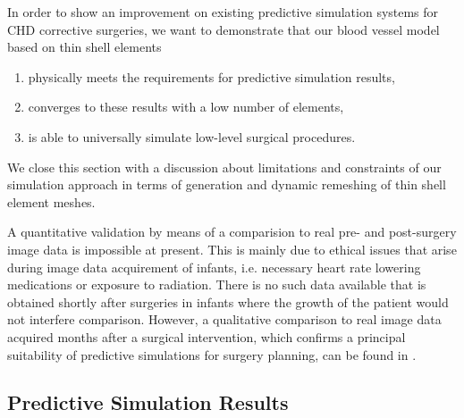 In order to show an improvement on existing predictive simulation systems for CHD corrective surgeries, we want to demonstrate that our blood vessel model based on thin shell elements
\begin{enumerate}
\item physically meets the requirements for predictive simulation results,
\item converges to these results with a low number of elements,
\item is able to universally simulate low-level surgical procedures.
\end{enumerate}
We close this section with a discussion about limitations and constraints of our simulation approach in terms of generation and dynamic remeshing of thin shell element meshes.

A quantitative validation by means of a comparision to real pre- and post-surgery image data is impossible at present. This is mainly due to ethical issues that arise during image data acquirement of infants, i.e. necessary heart rate lowering medications or exposure to radiation. There is no such data available that is obtained shortly after surgeries in infants where the growth of the patient would not interfere comparison. However, a qualitative comparison to real image data acquired months after a surgical intervention, which confirms a principal suitability of predictive simulations for surgery planning, can be found in \cite{Li2009}.

\subsection{Predictive Simulation Results}


